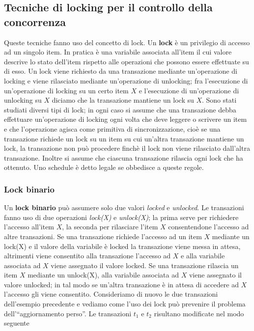 \subsection{Tecniche di locking per il controllo della concorrenza}
Queste tecniche fanno uso del concetto di lock. Un \textbf{lock} è un privilegio di accesso ad un singolo
item. In pratica è una variabile associata all'item il cui valore descrive lo stato dell'item rispetto alle
operazioni che possono essere effettuate su di esso. Un lock viene richiesto da una transazione
mediante un'operazione di locking e viene rilasciato mediante un'operazione di unlocking; fra
l'esecuzione di un'operazione di locking su un certo item $X$ e l'esecuzione di un'operazione di
unlocking su $X$ diciamo che la transazione mantiene un lock su $X$. Sono stati studiati diversi tipi di
lock; in ogni caso si assume che una transazione debba effettuare un'operazione di locking ogni
volta che deve leggere o scrivere un item e che l'operazione agisca come primitiva di
sincronizzazione, cioè se una transazione richiede un lock su un item su cui un'altra transazione
mantiene un lock, la transazione non può procedere finchè il lock non viene rilasciato dall'altra
transazione. Inoltre si assume che ciascuna transazione rilascia ogni lock che ha ottenuto. Uno
schedule è detto legale se obbedisce a queste regole.

\subsubsection{Lock binario}
Un \textbf{lock binario} può assumere solo due valori \emph{locked} e \emph{unlocked}. Le transazioni 
fanno uso di due operazioni \emph{lock(X)} e \emph{unlock(X)}; la prima serve per richiedere l'accesso
all'item $X$, la seconda per rilasciare l'item $X$ consentendone l'accesso ad altre transazioni. Se una 
transazione richiede l'accesso ad un item $X$ mediante un lock(X) e il valore della variabile è locked 
la transazione viene messa in attesa, altrimenti viene consentito alla transazione l'accesso ad $X$ e 
alla variabile associata ad $X$ viene assegnato il valore locked. 
Se una transazione rilascia un item $X$ mediante un unlock(X), alla variabile associata ad $X$ 
viene assegnato il valore unlocked; in tal modo se un'altra transazione è in attesa di accedere ad $X$ 
l'accesso gli viene consentito. Consideriamo di nuovo le due transazioni dell'esempio precedente e 
vediamo come l'uso dei lock può prevenire il problema dell'``aggiornamento perso''. 
Le transazioni $t_1$ e $t_2$ risultano modificate nel modo seguente 

